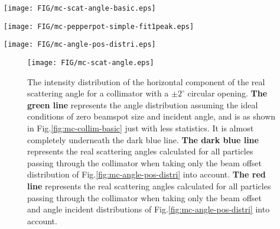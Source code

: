\documentclass[11pt]{report}
\begin{document}
\begin{figure*}
\centering
\texttt{[image: FIG/mc-scat-angle-basic.eps]}
\caption{The intensity distribution of the horizontal component of the scattering angle for a collimator with a $\pm 2^{\circ}$ circular opening is shown in red 
for the beam at the center of the target and with a 0$^{\circ}$ incidence angle.  
The five magenta peaks represent the central five 4 mm diameter holes of the central row of the pepperpot collimator, shown in Fig.\ref{fig:collimatorladder-pepperpot}, under similar conditions. 
For an even distribution of scattering angles the shape of the distributions is purely due to the geometry of the circular aperture.}
\label{fig:mc-collim-basic}
\end{figure*}
\begin{figure*}
\centering
\texttt{[image: FIG/mc-pepperpot-simple-fit1peak.eps]}
\caption{The intensity distribution of the horizontal component of the scattering angle for the central 4 mm diameter hole of the pepperpot collimator 
for the beam at the center of the target and with a 0$^{\circ}$ incidence angle.  
Clearly the geometry-induced shape of the peak is not quite gaussian. The standard deviation for the distribution is 0.068$^{\circ}$, and the gaussian fit yield $\sigma$=0.083$^{\circ}$.}
\label{fig:mc-pepperpot-simple-fit1peak}
\end{figure*}
\begin{figure*}
\centering
\texttt{[image: FIG/mc-angle-pos-distri.eps]}
\caption{The intensity distribution of the horizontal component of the beam position (blue, in m) and incident angle (red, in degr).}
\label{fig:mc-angle-pos-distri}
\end{figure*} 
\begin{figure}
\centering
\texttt{[image: FIG/mc-scat-angle.eps]}
\centering
\caption{The intensity distribution of the horizontal component of the real scattering angle for a collimator with a $\pm 2^{\circ}$ circular opening.
{\bf The green line} represents the angle distribution assuming the ideal conditions of zero beamspot size and incident angle, and is as shown in Fig.\ref{fig:mc-collim-basic} just with less statistics. It is almost completely underneath the dark blue line. 
{\bf The dark blue line} represents the real scattering angles calculated for all particles passing through the collimator when taking only the beam offset distribution of Fig.\ref{fig:mc-angle-pos-distri} into account. 
{\bf The red line} represents the real scattering angles calculated for all particles passing through the collimator when taking only the beam offset and angle incident distributions of Fig.\ref{fig:mc-angle-pos-distri} into account.}
\label{fig:mc-collim}
\end{figure} 
\end{document}
